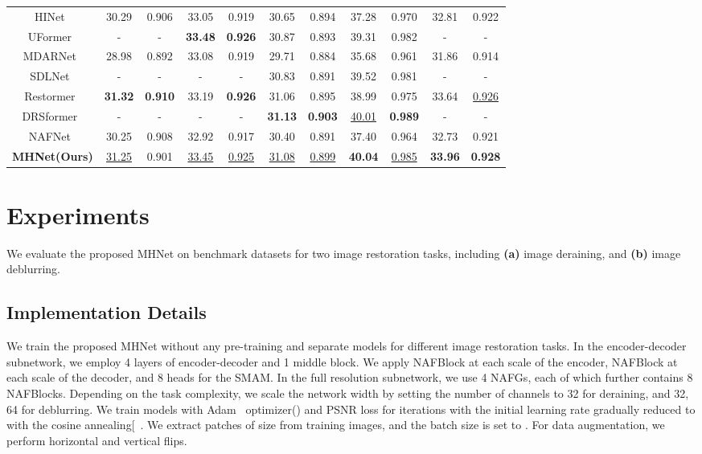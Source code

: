 \documentclass[lettersize,journal]{IEEEtran}
\begin{document}
\begin{table*}
\begin{tabular}{ccccccccc||cc}
      HINet~\cite{Chen_2021_CVPR}  & 30.29 & 0.906 & 33.05&  0.919   & 30.65 & 0.894 & 37.28 & 0.970 & 32.81  & 0.922
     \\
     UFormer~\cite{u2former} & - & - & \textbf{33.48} & \textbf{0.926} & 30.87 & 0.893 & 39.31 & 0.982 & - &-
     \\
     MDARNet~\cite{MDARNet} & 28.98 & 0.892 & 33.08 & 0.919 & 29.71 & 0.884 & 35.68 & 0.961 & 31.86 &0.914
     \\
      SDLNet~\cite{SDLNet} &- & - &- &- & 30.83 & 0.891 & 39.52 & 0.981 & - &-
     \\
     Restormer~\cite{Zamir2021Restormer} &\textbf{31.32} & \textbf{0.910} & 33.19 & \textbf{0.926} & 31.06 &0.895 &38.99 &0.975 &33.64 & \underline{0.926} 
     \\
     DRSformer~\cite{DRSformer} & - & - & - & - & \textbf{31.13} & \textbf{0.903} &\underline{40.01} & \textbf{0.989} & - & -
     \\
     \hline
      NAFNet~\cite{chen2022simple}  & 30.25 & 0.908 & 32.92 &  0.917   & 30.40 & 0.891  & 37.40 & 0.964 & 32.73  & 0.921
       \\
     \hline
      \textbf{MHNet(Ours)}  & \underline{31.25} & 0.901 & \underline{33.45} &  \underline{0.925}  &\underline{ 31.08} & \underline{0.899}  & \textbf{40.04} & \underline{0.985} & \textbf{33.96} & \textbf{0.928}
    \\
    \hline
\end{tabular}
\end{table*}




\section{Experiments}
We evaluate the proposed MHNet on benchmark datasets  for two image restoration tasks, including \textbf{(a)} image deraining, and \textbf{(b)} image deblurring.



\subsection{Implementation Details}
We train the proposed MHNet without any pre-training and separate models for different image restoration tasks. In the encoder-decoder subnetwork, we employ 4 layers of encoder-decoder and 1 middle block. We apply  NAFBlock at each scale of the encoder,  NAFBlock at each scale of the decoder, and 8 heads for the SMAM. In the full resolution subnetwork, we use 4 NAFGs, each of which further contains 8 NAFBlocks. Depending on the task complexity, we scale the network width by setting the number of channels to 32 for deraining, and 32, 64 for deblurring. We train models with Adam~\cite{2014Adam} optimizer() and PSNR loss for  iterations with the initial learning rate  gradually reduced to   with the cosine annealing[~\cite{2016SGDR}. We extract patches of size  from training images, and the batch size is set to . For data augmentation, we perform horizontal and vertical flips. 
\end{document}

